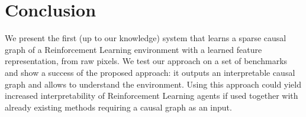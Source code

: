 \documentclass[a4paper,11pt,oneside]{report}
\begin{document}








\chapter{Conclusion}
\label{ch:conclusion}

We present the first (up to our knowledge) system that learns a sparse causal graph of a Reinforcement Learning environment with a learned feature representation, from raw pixels. We test our approach on a set of benchmarks and show a success of the proposed approach: it outputs an interpretable causal graph and allows to understand the environment. Using this approach could yield increased interpretability of Reinforcement Learning agents if used together with already existing methods requiring a causal graph as an input.
\end{document}

